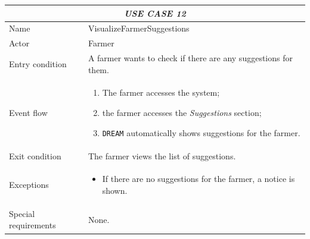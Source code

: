 \documentclass{article}
\begin{document}
\centering
\begin{longtable}{|p{3.5cm}|m{8cm}|}
 \hline
 \multicolumn{2}{|c|}{\cellcolor{white}\emph{USE CASE 12}} \\
 \endfirsthead
 \endhead
 \endfoot
 \endlastfoot
 \hline
 Name & VisualizeFarmerSuggestions\\
 \hline
 Actor & Farmer\\
 \hline
 Entry condition & A farmer wants to check if there are any suggestions for them.\\
 \hline
 Event flow & \begin{enumerate}
    \item The farmer accesses the system;
    \item the farmer accesses the \emph{Suggestions} section;
    \item \verb|DREAM| automatically shows suggestions for the farmer.
 \end{enumerate}\\
 \hline
 Exit condition & The farmer views the list of suggestions.\\
 \hline
 Exceptions & \begin{itemize}
     \item If there are no suggestions for the farmer, a notice is shown.
 \end{itemize}\\
 \hline
 Special requirements & None.\\
 \hline
\end{longtable}
\newpage
\end{document}
